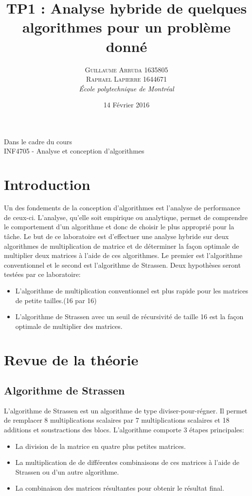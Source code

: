 \documentclass[a4paper, 12pt]{article} %
\title{TP1 : Analyse hybride de quelques algorithmes pour un problème donné}
\author{\textsc{Guillaume Arruda 1635805\\Raphael Lapierre 1644671} %
\vspace{10pt}
\\{\textit{École polytechnique de Montréal}}} %
\date{14 Février 2016} %
\makeatletter
\renewcommand{\maketitle}{ %
\begin{center} %

\vspace*{25pt} %
{\LARGE\@title} %

\vspace{125pt} %

{\large\@author} %

\vspace{125pt} %
Dans le cadre du cours
\\INF4705 - Analyse et conception d'algorithmes
\vspace{125pt} %
\\\@date %
\vspace{125pt} %

\end{center}
}
\makeatother
\begin{document}
\thispagestyle{empty}
\clearpage\maketitle %
\pagebreak[4]
\tableofcontents
\pagebreak[4]

\setlength{\headheight}{15.0pt}
\pagestyle{fancy}
\fancyhead[C]{}

\section{Introduction}
Un des fondements de la conception d'algorithmes est l'analyse de performance de ceux-ci. L'analyse, qu'elle soit empirique ou analytique, permet de comprendre le comportement d'un algorithme
et donc de choisir le plus approprié pour la tâche. Le but de ce laboratoire est d'effectuer une analyse hybride sur deux algorithmes de multiplication de matrice et de déterminer la façon optimale de multiplier deux matrices à l'aide de ces algorithmes. Le premier est l'algorithme conventionnel et le second est l'algorithme de Strassen. Deux hypothèses seront testées par ce laboratoire:
\begin{itemize}
\item L'algorithme de multiplication conventionnel est plus rapide pour les matrices de petite tailles.(16 par 16)
\item L'algorithme de Strassen avec un seuil de récursivité de taille 16 est la façon optimale de multiplier des matrices.
\end{itemize}
\section{Revue de la théorie}
\subsection{Algorithme de Strassen}
L'algorithme de Strassen est un algorithme de type diviser-pour-régner. Il permet de remplacer 8 multiplications scalaires par 7 multiplications scalaires et 18 additions et soustractions des blocs.
L'algorithme comporte 3 étapes principales:
\begin{itemize}
\item La division de la matrice en quatre plus petites matrices.
\item La multiplication de de différentes combinaisons de ces matrices à l'aide de Strassen ou d'un autre algorithme.
\item La combinaison des matrices résultantes pour obtenir le résultat final.
\end{itemize}
\end{document}
